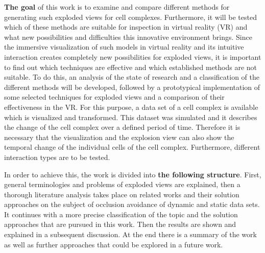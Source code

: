\textbf{The goal} of this work is to examine and compare different methods for generating such exploded views for cell complexes. Furthermore, it will be tested which of these methods are suitable for inspection in virtual reality (VR) and what new possibilities and difficulties this innovative environment brings.
Since the immersive visualization of such models in virtual reality and its intuitive interaction creates completely new possibilities for exploded views, it is important to find out which techniques are effective and which established methods are not suitable.
To do this, an analysis of the state of research and a classification of the different methods will be developed, followed by a prototypical implementation of some selected techniques for exploded views and a comparison of their effectiveness in the VR.
For this purpose, a data set of a cell complex is available which is visualized and transformed. 
This dataset was simulated and it describes the change of the cell complex over a defined period of time. 
Therefore it is necessary that the visualization and the explosion view can also show the temporal change of the individual cells of the cell complex.
Furthermore, different interaction types are to be tested. 

In order to achieve this, the work is divided into \textbf{the following structure}. 
First, general terminologies and problems of exploded views are explained, then a thorough literature analysis takes place on related works and their solution approaches on the subject of occlusion avoidance of dynamic and static data sets.
It continues with a more precise classification of the topic and the solution approaches that are pursued in this work. 
Then the results are shown and explained in a subsequent discussion. At the end there is a summary of the work as well as further approaches that could be explored in a future work.

